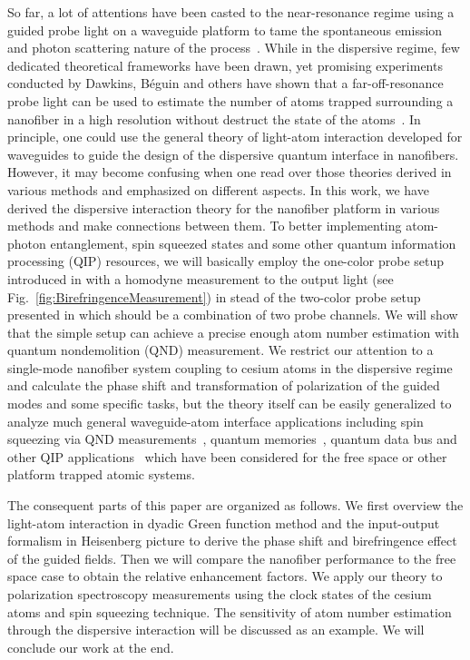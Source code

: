 \documentclass[preprint,aps,pra,onecolumn]{revtex4-1} %
\begin{document}
So far, a lot of attentions have been casted to the near-resonance regime using a guided probe light on a waveguide platform to tame the spontaneous emission and photon scattering nature of the process~\cite{Domokos2002a,LeKien2005,LeKien2005a,LeKien2006,Shen2007,LeKien2009b,Das2010,LeKien2011,Reitz2014,LeKien2014,Mitsch2014,Schneeweiss2014}. While in the dispersive regime, few dedicated theoretical frameworks have been drawn, yet promising experiments conducted by Dawkins, B{\'e}guin and others have shown that a far-off-resonance probe light can be used to estimate the number of atoms trapped surrounding a nanofiber in a high resolution without destruct the state of the atoms~\cite{Dawkins2011,Beguin2014}. In principle, one could use the general theory of light-atom interaction developed for waveguides to guide the design of the dispersive quantum interface in nanofibers. However, it may become confusing when one read over those theories derived in various methods and emphasized on different aspects. In this work, we have derived the dispersive interaction theory for the nanofiber platform in various methods and make connections between them. To better implementing atom-photon entanglement, spin squeezed states and some other quantum information processing (QIP) resources, we will basically employ the one-color probe setup introduced in \cite{Dawkins2011} with a homodyne measurement to the output light (see Fig.~\ref{fig:BirefringenceMeasurement}) in stead of the two-color probe setup presented in \cite{Beguin2014} which should be a combination of two probe channels.  We will show that the simple setup can achieve a precise enough atom number estimation with quantum nondemolition (QND) measurement.  We restrict our attention to a single-mode nanofiber system coupling to cesium atoms in the dispersive regime and calculate the phase shift and transformation of polarization of the guided modes and some specific tasks, but the theory itself can be easily generalized to analyze much general waveguide-atom interface applications including spin squeezing via QND measurements~\cite{Kuzmich2000,Deutsch2010a}, quantum memories~\cite{Julsgaard2004,Choi2008,Hosseini2011,Hosseini2011a,Vasilyev2012}, quantum data bus and other QIP applications~\cite{Brennen1999} which have been considered for the free space or other platform trapped atomic systems. 

The consequent parts of this paper are organized as follows. We first overview the light-atom interaction in dyadic Green function method and the input-output formalism in Heisenberg picture to derive the phase shift and birefringence effect of the guided fields. Then we will compare the nanofiber performance to the free space case to obtain the relative enhancement factors. We apply our theory to polarization spectroscopy measurements using the clock states of the cesium atoms and spin squeezing technique. The sensitivity of atom number estimation through the dispersive interaction will be discussed as an example. We will conclude our work at the end. 
\end{document}

